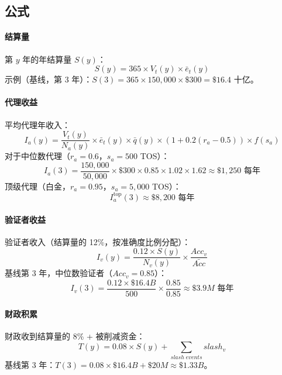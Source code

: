 \documentclass[11pt]{article}
\begin{document}
\subsection{公式}
\paragraph{结算量} 第 $y$ 年的年结算量 $S(y)$：
\begin{equation}
S(y) = 365 \times V_t(y) \times \bar{e}_t(y)
\end{equation}
示例（基线，第 3 年）：$S(3) = 365 \times 150{,}000 \times \$300 = \$16.4$ 十亿。

\paragraph{代理收益} 平均代理年收入：
\begin{equation}
I_a(y) = \frac{V_t(y)}{N_a(y)} \times \bar{e}_t(y) \times \bar{q}(y) \times (1 + 0.2(r_a - 0.5)) \times f(s_a)
\end{equation}
对于中位数代理（$r_a = 0.6$，$s_a = 500$ TOS）：
\begin{equation}
I_a(3) = \frac{150{,}000}{50{,}000} \times \$300 \times 0.85 \times 1.02 \times 1.62 \approx \$1{,}250 \text{ 每年}
\end{equation}
顶级代理（白金，$r_a = 0.95$，$s_a = 5{,}000$ TOS）：
\begin{equation}
I_a^{\text{top}}(3) \approx \$8{,}200 \text{ 每年}
\end{equation}

\paragraph{验证者收益} 验证者收入（结算量的 12\%，按准确度比例分配）：
\begin{equation}
I_v(y) = \frac{0.12 \times S(y)}{N_v(y)} \times \frac{Acc_v}{\bar{Acc}}
\end{equation}
基线第 3 年，中位数验证者（$Acc_v = 0.85$）：
\begin{equation}
I_v(3) = \frac{0.12 \times \$16.4B}{500} \times \frac{0.85}{0.85} \approx \$3.9M \text{ 每年}
\end{equation}

\paragraph{财政积累} 财政收到结算量的 8\% + 被削减资金：
\begin{equation}
T(y) = 0.08 \times S(y) + \sum_{slash \; events} slash_v
\end{equation}
基线第 3 年：$T(3) = 0.08 \times \$16.4B + \$20M \approx \$1.33B$。
\end{document}
